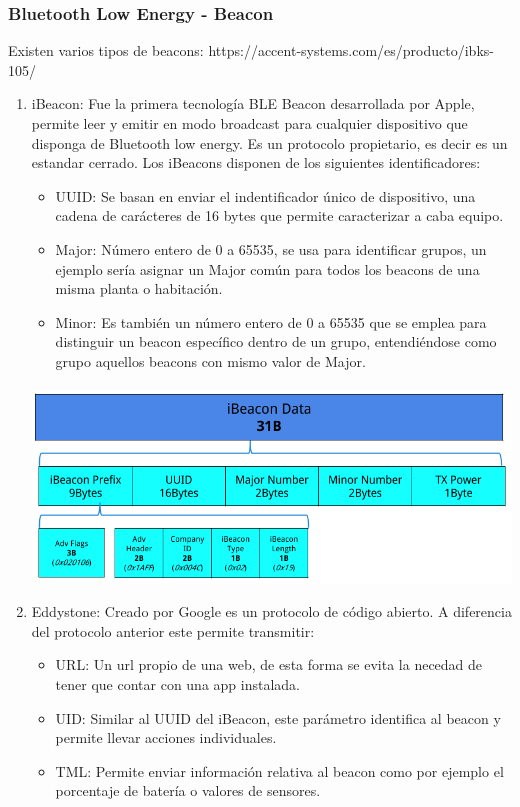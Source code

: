 \documentclass[a4paper ,12pt, onecolumn]{article}
\begin{document}
        \subsubsection {Bluetooth Low Energy - Beacon}
            Existen varios tipos de beacons:
            https://accent-systems.com/es/producto/ibks-105/
            \begin{enumerate}
                \item iBeacon: Fue la primera tecnología BLE Beacon desarrollada por Apple, permite leer y emitir en modo 
                broadcast para cualquier dispositivo que disponga de Bluetooth low energy. Es un protocolo propietario, es 
                decir es un estandar cerrado. 
                Los iBeacons disponen de los siguientes identificadores:
                \begin{itemize}
                    \item UUID: Se basan en enviar el indentificador único de dispositivo, una cadena de
                    carácteres de 16 bytes que permite caracterizar a caba equipo.
                    \item Major: Número entero de 0 a 65535, se usa para identificar grupos, un ejemplo sería 
                    asignar un Major común para todos los beacons de una misma planta o habitación.
                    \item Minor: Es también un número entero de 0 a 65535 que se emplea para distinguir un beacon
                    específico dentro de un grupo, entendiéndose como grupo aquellos beacons con mismo valor de Major.
                \end{itemize}
                \paragraph{}
                \includegraphics[scale=0.5]{tipos_beacon_ibeacon.PNG}
                \item Eddystone: Creado por Google es un protocolo de código abierto. A diferencia del protocolo anterior este 
                permite transmitir:
                \begin{itemize}
                    \item URL: Un url propio de una web, de esta forma se evita la necedad de tener que contar con una app instalada.
                    \item UID: Similar al UUID del iBeacon, este parámetro identifica al beacon y permite llevar acciones individuales.
                    \item TML: Permite enviar información relativa al beacon como por ejemplo el porcentaje de batería o valores de sensores.
                \end{itemize}

\end{enumerate}
\end{document}
